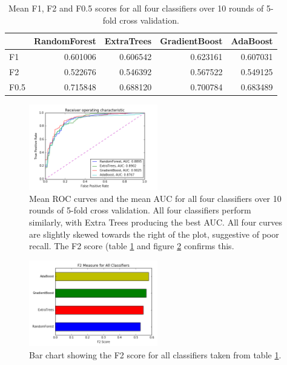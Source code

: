 \documentclass[journal]{IEEEtran}
\begin{document}
\begin{table}
\caption{Mean F1, F2 and F0.5 scores for all four classifiers over 10 rounds of 5-fold cross validation.}
\label{table:f-scores}
\begin{tabular}{lrrrr}
{} &  RandomForest &  ExtraTrees &  GradientBoost &  AdaBoost \\
\hline
F1   &      0.601006 &    0.606542 &       0.623161 &  0.607031 \\
F2   &      0.522676 &    0.546392 &       0.567522 &  0.549125 \\
F0.5 &      0.715848 &    0.688120 &       0.700784 &  0.683489 \\
\end{tabular}

\end{table}

\begin{figure}[!t]
\centering
\includegraphics[width=0.5\textwidth]{../src/img/roc_cv.png}
\caption{Mean ROC curves and the mean AUC for all four classifiers over 10 rounds of 5-fold cross validation. All four classifiers perform similarly, with Extra Trees producing the best AUC. All four curves are slightly skewed towards the right of the plot, suggestive of poor recall. The F2 score (table \ref{table:f-scores} and figure \ref{fig:f2-score} confirms this.}
\label{fig:roc-cv}
\end{figure}

\begin{figure}[!t]
\centering
\includegraphics[width=0.5\textwidth]{../src/img/f2_score.png}
\caption{Bar chart showing the F2 score for all classifiers taken from table \ref{table:f-scores}.}
\label{fig:f2-score}
\end{figure}
\end{document}
